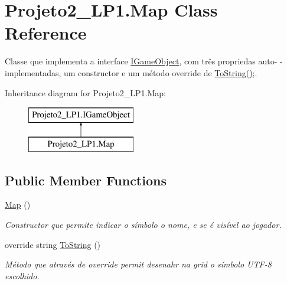 \hypertarget{class_projeto2___l_p1_1_1_map}{}\section{Projeto2\+\_\+\+L\+P1.\+Map Class Reference}
\label{class_projeto2___l_p1_1_1_map}


Classe que implementa a interface \mbox{\hyperlink{interface_projeto2___l_p1_1_1_i_game_object}{I\+Game\+Object}}, com três propriedas auto-\/ -\/implementadas, um constructor e um método override de \mbox{\hyperlink{class_projeto2___l_p1_1_1_map_a4693bc7aa33a5c2c98d99dcd5dc1f524}{To\+String()}};.  


Inheritance diagram for Projeto2\+\_\+\+L\+P1.\+Map\+:\begin{figure}[H]
\begin{center}
\leavevmode
\includegraphics[height=2.000000cm]{class_projeto2___l_p1_1_1_map}
\end{center}
\end{figure}
\subsection*{Public Member Functions}
\begin{DoxyCompactItemize}
\item 
\mbox{\hyperlink{class_projeto2___l_p1_1_1_map_a8ae219bdbad54518c568b3a77e97b6bf}{Map}} ()
\begin{DoxyCompactList}\small\item\em Constructor que permite indicar o símbolo o nome, e se é visível ao jogador. \end{DoxyCompactList}\item 
override string \mbox{\hyperlink{class_projeto2___l_p1_1_1_map_a4693bc7aa33a5c2c98d99dcd5dc1f524}{To\+String}} ()
\begin{DoxyCompactList}\small\item\em Método que através de override permit desenahr na grid o símbolo U\+T\+F-\/8 escolhido. \end{DoxyCompactList}\end{DoxyCompactItemize}
